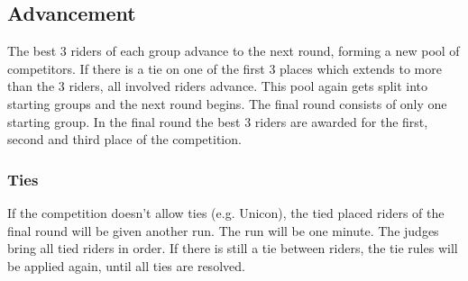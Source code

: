 \subsection{Advancement}
The best 3 riders of each group advance to the next round, forming a new pool of competitors.
If there is a tie on one of the first 3 places which extends to more than the 3 riders, all involved riders advance.
This pool again gets split into starting groups and the next round begins.
The final round consists of only one starting group.
In the final round the best 3 riders are awarded for the first, second and third place of the competition.

\subsubsection{Ties}
If the competition doesn't allow ties (e.g. Unicon), the tied placed riders of the final round will be given another run.
The run will be one minute.
The judges bring all tied riders in order.
If there is still a tie between riders, the tie rules will be applied again, until all ties are resolved.

